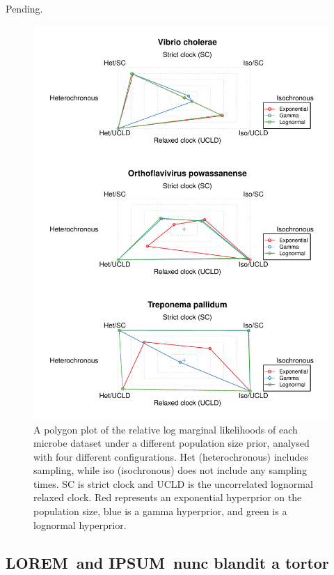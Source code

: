 \documentclass[10pt,letterpaper]{article}
\newcommand{\lorem}{{\bf LOREM}}
\newcommand{\ipsum}{{\bf IPSUM}}
\begin{document}
Pending.
\begin{figure}
		\includegraphics[width=12cm]{sandbox_figures/polygon_plot.pdf}\newline
		\vspace{-0.5cm}
		\caption{A polygon plot of the relative log marginal likelihoods of each microbe dataset under a different population size prior, analysed with four different configurations. Het (heterochronous) includes sampling, while iso (isochronous) does not include any sampling times. SC is strict clock and UCLD is the uncorrelated lognormal relaxed clock. Red represents an exponential hyperprior on the population size, blue is a gamma hyperprior, and green is a lognormal hyperprior.}
		\label{figure:polygon_plots}
\end{figure}


\subsection*{\lorem\ and \ipsum\ nunc blandit a tortor}
\end{document}

